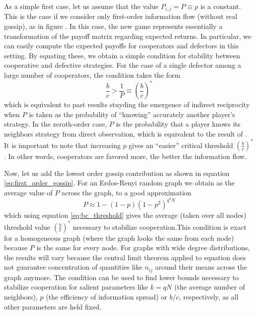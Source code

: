 \documentclass{article}
\renewcommand{\=}[1]{\stackrel{#1}{=}} %
\begin{document}
As a simple first case, let us assume that the value $P_{i,j} = P \equiv p$ is a constant. This is the case if we consider only first-order information flow (without real gossip), as in figure \protect{}. In this case, the new game
represents essentially a transformation of the payoff matrix regarding
expected returns. In particular, we can easily compute the expected payoffs for cooperators and defectors in this setting. By equating these, we obtain a simple condition for stability between cooperative and defective strategies. For the case of a single defector among a large number of cooperators, the condition takes the form
\begin{equation}\label{eq:bc_threshold}
\frac{b}{c} > \frac{1}{P} \equiv \left( \frac{b}{c}\right)^*
\end{equation}
which is equivalent to past results stuyding the emergence of indirect reciprocity \cite{nowak1998evolution} when $P$ is taken as the probability of ``knowing'' accurately another player's strategy. In the zeroth-order case, $P$ is the probability that a player knows its neighbors strategy from direct observation, which is equivalent to the result of \cite{nowak2006five}.
It is important to note that increasing $p$ gives an ``easier'' critical threshold $\left( \frac{b}{c}\right)^*$. In other words, cooperators are favored more, the better the information flow.

Now, let us add the lowest order gossip contribution as shown in equation \ref{eq:first_order_gossip}.
For an Erdos-Renyi random graph we obtain as the average value of $P$ across the graph, to a good approximation
\begin{equation}\label{eq:P_first_order}
P \approx 1 - (1-p)(1-p^2)^{q^2N}
\end{equation}
which using equation \ref{eq:bc_threshold} gives the average (taken over all nodes) threshold value $\left( \frac{b}{c}\right)^*$ necessary to stabilize cooperation.This condition is exact for
a homogeneous graph (where the graph looks the same from each node) because $P$ is the same for every node. For graphs with wide degree distributions, the results will vary because the central limit theorem applied to equation \label{eq:first_order_gossip} does not guarantee concentration of quantities like $n_{ij}$ around their means across the graph anymore. The condition can be used to find lower bounds necessary to stabilize cooperation for salient parameters like $k = q N$ (the average number of neighbors), $p$ (the efficiency of information spread) or $b/c$, respectively, as all other parameters are held fixed.
\end{document}
